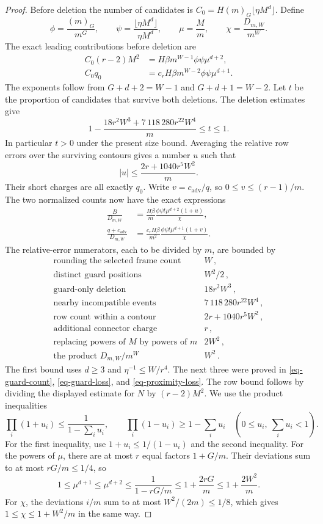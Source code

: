 \begin{proof}
Before deletion the number of candidates is
$C_0=H(m)_G\lfloor\eta M^d\rfloor$. Define
\[
 \phi=\frac{(m)_G}{m^G},\qquad
 \psi=\frac{\lfloor\eta M^d\rfloor}{\eta M^d},\qquad
 \mu=\frac{M}{m},\qquad
 \chi=\frac{D_{m,W}}{m^W}.
\]
The exact leading contributions before deletion are
\begin{align*}
 C_0(r-2)M^2
   &=H\beta m^{W-1}\phi\psi\mu^{d+2},\\
 C_0q_0
   &=c_rH\beta m^{W-2}\phi\psi\mu^{d+1}.
\end{align*}
The exponents follow from $G+d+2=W-1$ and $G+d+1=W-2$.
Let $t$ be the proportion of candidates that survive both deletions.
The deletion estimates give
\[
 1-\frac{18r^2W^3+7\,118\,280r^{22}W^4}{m}\le t\le1.
\]
In particular $t>0$ under the present size bound. Averaging the relative
row errors over the surviving contours gives a number $u$ such that
\[
 |u|\le\frac{2r+1040r^5W^2}{m}.
\]
Their short charges are all exactly $q_0$. Write
$v=c_{\mathrm{adv}}/q$, so $0\le v\le(r-1)/m$. The two normalized
counts now have the exact expressions
\begin{align*}
 \frac{B}{D_{m,W}}
   &=\frac{H\beta}{m}
     \frac{\phi\psi t\mu^{d+2}(1+u)}{\chi},\\
 \frac{q+c_{\mathrm{adv}}}{D_{m,W}}
   &=\frac{c_rH\beta}{m^2}
     \frac{\phi\psi t\mu^{d+1}(1+v)}{\chi}.
\end{align*}
The relative-error numerators, each to be divided by $m$, are bounded by
\[
\begin{array}{lr}
\text{rounding the selected frame count}&W\,,\\
\text{distinct guard positions}&W^2/2\,,\\
\text{guard-only deletion}&18r^2W^3\,,\\
\text{nearby incompatible events}&7\,118\,280r^{22}W^4\,,\\
\text{row count within a contour}&2r+1040r^5W^2\,,\\
\text{additional connector charge}&r\,,\\
\text{replacing powers of }M\text{ by powers of }m&2W^2\,,\\
\text{the product }D_{m,W}/m^W&W^2\,.
\end{array}
\]
The first bound uses $d\ge3$ and $\eta^{-1}\le W/r^4$.
The next three were proved in \eqref{eq-guard-count},
\eqref{eq-guard-loss}, and \eqref{eq-proximity-loss}.
The row bound follows by dividing the displayed estimate for $N$ by
$(r-2)M^2$. We use the product inequalities
\[
 \prod_i(1+u_i)\le\frac1{1-\sum_i u_i},\qquad
 \prod_i(1-u_i)\ge1-\sum_i u_i
 \quad(0\le u_i,\ \sum_i u_i<1).
\]
For the first inequality, use $1+u_i\le1/(1-u_i)$ and the second
inequality. For the powers of $\mu$, there are at most $r$ equal factors
$1+G/m$. Their deviations sum to at most $rG/m\le1/4$, so
\[
 1\le\mu^{d+1}\le\mu^{d+2}
 \le\frac1{1-rG/m}\le1+\frac{2rG}{m}
 \le1+\frac{2W^2}{m}.
\]
For $\chi$, the deviations $i/m$ sum to at most $W^2/(2m)\le1/8$,
which gives $1\le\chi\le1+W^2/m$ in the same way.


\end{proof}
